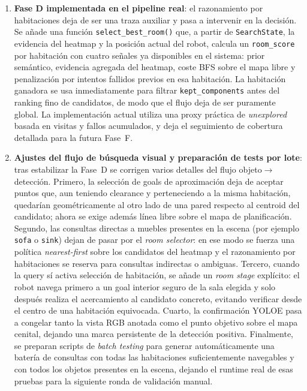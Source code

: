 \begin{enumerate}
  \item \textbf{Fase D implementada en el pipeline real}: el razonamiento por
        habitaciones deja de ser una traza auxiliar y pasa a intervenir en la
        decisión. Se añade una función \texttt{select\_best\_room()} que, a
        partir de \texttt{SearchState}, la evidencia del heatmap y la posición
        actual del robot, calcula un \texttt{room\_score} por habitación con
        cuatro señales ya disponibles en el sistema: prior semántico, evidencia
        agregada del heatmap, coste BFS sobre el mapa libre y penalización por
        intentos fallidos previos en esa habitación. La habitación ganadora se
        usa inmediatamente para filtrar \texttt{kept\_components} antes del
        ranking fino de candidatos, de modo que el flujo deja de ser
        puramente global. La implementación actual utiliza una proxy práctica
        de \textit{unexplored} basada en visitas y fallos acumulados, y deja
        el seguimiento de cobertura detallada para la futura Fase~F.

  \item \textbf{Ajustes del flujo de búsqueda visual y preparación de tests por
        lote}: tras estabilizar la Fase~D se corrigen varios detalles del flujo
        objeto$\rightarrow$detección. Primero, la selección de goals de
        aproximación deja de aceptar puntos que, aun teniendo clearance y
        perteneciendo a la misma habitación, quedarían geométricamente al otro
        lado de una pared respecto al centroid del candidato; ahora se exige
        además línea libre sobre el mapa de planificación. Segundo, las
        consultas directas a muebles presentes en la escena (por ejemplo
        \texttt{sofa} o \texttt{sink}) dejan de pasar por el \textit{room
        selector}: en ese modo se fuerza una política \textit{nearest-first}
        sobre los candidatos del heatmap y el razonamiento por habitaciones se
        reserva para consultas indirectas o ambiguas. Tercero, cuando la query
        sí activa selección de habitación, se añade un \textit{room stage}
        explícito: el robot navega primero a un goal interior seguro de la sala
        elegida y solo después realiza el acercamiento al candidato concreto,
        evitando verificar desde el centro de una habitación equivocada.
        Cuarto, la confirmación YOLOE pasa a congelar tanto la vista RGB
        anotada como el punto objetivo sobre el mapa cenital, dejando una marca
        persistente de la detección positiva. Finalmente, se preparan scripts
        de \textit{batch testing} para generar automáticamente una batería de
        consultas con todas las habitaciones suficientemente navegables y con
        todos los objetos presentes en la escena, dejando el runtime real de
        esas pruebas para la siguiente ronda de validación manual.

\end{enumerate}

